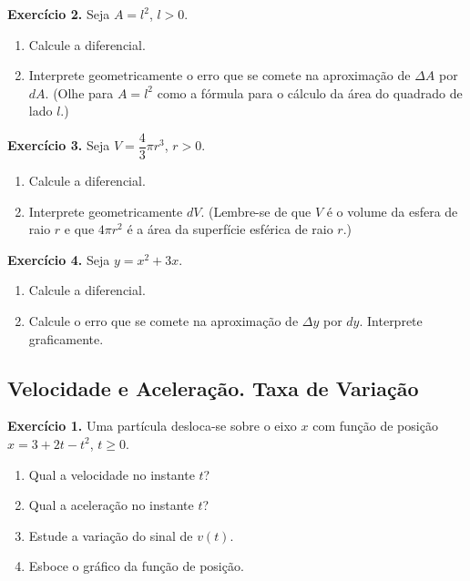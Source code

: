 \documentclass[12pt,a4paper]{article}
\begin{document}
\vspace{0.5cm}
\noindent\textbf{Exercício 2.} Seja $A = l^2$, $l > 0$.
\begin{enumerate}
    \renewcommand{\theenumi}{\alph{enumi}}
    \renewcommand{\labelenumi}{\theenumi)}
    \item Calcule a diferencial.
    \item Interprete geometricamente o erro que se comete na aproximação de $\Delta A$ por $dA$. (Olhe para $A = l^2$ como a fórmula para o cálculo da área do quadrado de lado $l$.)
\end{enumerate}

\vspace{0.5cm}
\noindent\textbf{Exercício 3.} Seja $V = \dfrac{4}{3}\pi r^3$, $r > 0$.
\begin{enumerate}
    \renewcommand{\theenumi}{\alph{enumi}}
    \renewcommand{\labelenumi}{\theenumi)}
    \item Calcule a diferencial.
    \item Interprete geometricamente $dV$. (Lembre-se de que $V$ é o volume da esfera de raio $r$ e que $4\pi r^2$ é a área da superfície esférica de raio $r$.)
\end{enumerate}

\vspace{0.5cm}
\noindent\textbf{Exercício 4.} Seja $y = x^2 + 3x$.
\begin{enumerate}
    \renewcommand{\theenumi}{\alph{enumi}}
    \renewcommand{\labelenumi}{\theenumi)}
    \item Calcule a diferencial.
    \item Calcule o erro que se comete na aproximação de $\Delta y$ por $dy$. Interprete graficamente.
\end{enumerate}

\subsection{Velocidade e Aceleração. Taxa de Variação}
\vspace{0.5cm}
\noindent\textbf{Exercício 1.} Uma partícula desloca-se sobre o eixo $x$ com função de posição $x = 3 + 2t - t^2$, $t \ge 0$.
\begin{enumerate}
    \renewcommand{\theenumi}{\alph{enumi}}
    \renewcommand{\labelenumi}{\theenumi)}
    \item Qual a velocidade no instante $t$?
    \item Qual a aceleração no instante $t$?
    \item Estude a variação do sinal de $v(t)$.
    \item Esboce o gráfico da função de posição.
\end{enumerate}
\end{document}
